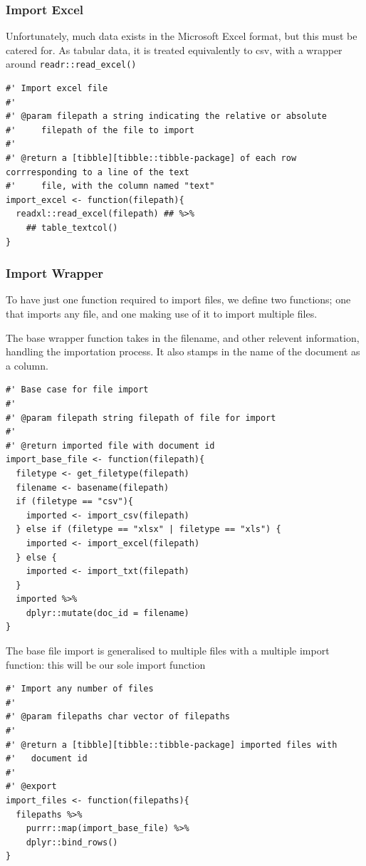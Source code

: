 \documentclass[11pt, a4paper, oneside]{report}
\begin{document}
\subsubsection{Import Excel}
\label{sec:org7535b78}
Unfortunately, much data exists in the Microsoft Excel format, but
this must be catered for. As tabular data, it is treated equivalently
to csv, with a wrapper around \texttt{readr::read_excel()}
\begin{verbatim}
#' Import excel file
#'
#' @param filepath a string indicating the relative or absolute
#'     filepath of the file to import
#'
#' @return a [tibble][tibble::tibble-package] of each row corrresponding to a line of the text
#'     file, with the column named "text"
import_excel <- function(filepath){
  readxl::read_excel(filepath) ## %>%
    ## table_textcol()
}
\end{verbatim}
\subsubsection{Import Wrapper}
\label{sec:orgf966fad}
To have just one function required to import files, we define two
functions; one that imports any file, and one making use of it to
import multiple files.

The base wrapper function takes in the
filename, and other relevent information, handling the importation
process. It also stamps in the name of the document as a column.
\begin{verbatim}
#' Base case for file import
#'
#' @param filepath string filepath of file for import
#'
#' @return imported file with document id
import_base_file <- function(filepath){
  filetype <- get_filetype(filepath)
  filename <- basename(filepath)
  if (filetype == "csv"){
    imported <- import_csv(filepath)
  } else if (filetype == "xlsx" | filetype == "xls") {
    imported <- import_excel(filepath)
  } else {
    imported <- import_txt(filepath)
  }
  imported %>%
    dplyr::mutate(doc_id = filename)
}
\end{verbatim}
The base file import is generalised to multiple files with a multiple
import function: this will be our sole import function
\begin{verbatim}
#' Import any number of files
#'
#' @param filepaths char vector of filepaths
#'
#' @return a [tibble][tibble::tibble-package] imported files with
#'   document id
#' 
#' @export
import_files <- function(filepaths){
  filepaths %>%
    purrr::map(import_base_file) %>%
    dplyr::bind_rows()
}
\end{verbatim}
\end{document}
